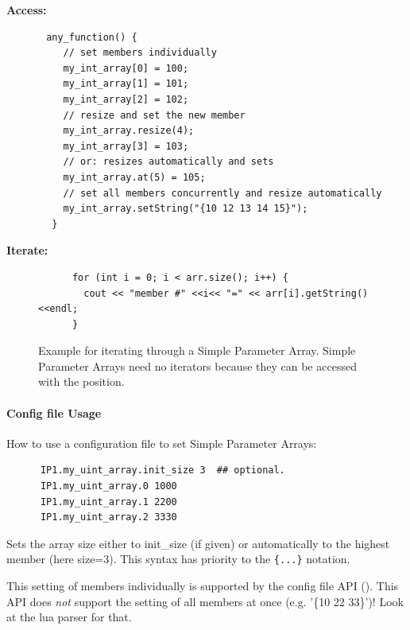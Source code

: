 \noindent
\begin{minipage}{\textwidth}
{\bf Access:}
\begin{lstlisting}
       any_function() {
          // set members individually
          my_int_array[0] = 100;
          my_int_array[1] = 101;
          my_int_array[2] = 102;
          // resize and set the new member
          my_int_array.resize(4);
          my_int_array[3] = 103;
          // or: resizes automatically and sets
          my_int_array.at(5) = 105;
          // set all members concurrently and resize automatically
          my_int_array.setString("{10 12 13 14 15}");
        }
\end{lstlisting}
\end{minipage}

\noindent
\begin{minipage}{\textwidth}
{\bf Iterate:}
\begin{figure}[H]
\begin{lstlisting}
      for (int i = 0; i < arr.size(); i++) {
        cout << "member #" <<i<< "=" << arr[i].getString() <<endl;
      }
\end{lstlisting}
  \caption{Example for iterating through a Simple Parameter Array. Simple Parameter Arrays need no iterators because they can be accessed with the position.}
  \label{fig:SimParamIter}
\end{figure}
\end{minipage}


\paragraph{Config file Usage} How to use a configuration file to set Simple Parameter Arrays:

\vspace{.5 cm}

\noindent
\begin{minipage}{\textwidth}
\begin{lstlisting}
      IP1.my_uint_array.init_size 3  ## optional.
      IP1.my_uint_array.0 1000
      IP1.my_uint_array.1 2200
      IP1.my_uint_array.2 3330
\end{lstlisting}
\end{minipage}

Sets the array size either to \textsf{init\_size} (if given) or automatically to the highest member (here \textsf{size=3}). This syntax has priority to the \lstinline|{...}| notation.

This setting of members individually is supported by the \GreenConfig config file API (). This API does {\em not} support the setting of all members at once (e.g. '\textsf{\{10 22 33\}}')! Look at the lua parser for that.

